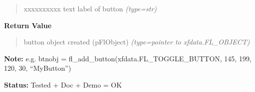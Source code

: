 \begin{boxedminipage}{\funcwidth}
\begin{quote}
\begin{Ventry}{xxxxxxxxxx}
text label of button
            {\it (type=str)}

        \end{Ventry}

      \end{quote}

      \textbf{Return Value}
    \vspace{-1ex}

      \begin{quote}

button object created (pFlObject)
      {\it (type=pointer to xfdata.FL\_OBJECT)}

      \end{quote}

\textbf{Note:} 
e.g. btnobj = fl\_add\_button(xfdata.FL\_TOGGLE\_BUTTON, 145,
199, 120, 30, ``MyButton'')


\textbf{Status:} 
Tested + Doc + Demo = OK


    \end{boxedminipage}

    \label{xformslib:flbutton:fl_add_bitmapbutton}

    \vspace{0.5ex}

